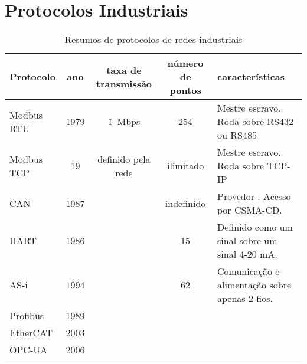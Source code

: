 \section{Protocolos Industriais}

\begin{table}[h]
    \caption{Resumos de protocolos de redes industriais}\label{tab:protocolos}
    \begin{tabular}{l|cccl}
        \hline
        Protocolo & ano & taxa de transmissão & número de pontos & características\\
        \hline
        Modbus RTU & 1979 & \~1~Mbps & 254 & Mestre escravo. Roda sobre RS432 ou RS485\\
        Modbus TCP & 19 & definido pela rede & ilimitado & Mestre escravo. Roda sobre TCP-IP\\
        CAN & 1987 & & indefinido & Provedor-. Acesso por CSMA-CD.\\
        HART & 1986 & & 15 & Definido como um sinal sobre um sinal 4-20 mA.\\
        AS-i & 1994 & & 62 & Comunicação e alimentação sobre apenas 2 fios.\\
        Profibus & 1989 & & & \\
        EtherCAT & 2003 & & & \\
        OPC-UA & 2006 & & & \\
        \hline
    \end{tabular}
\end{table}

